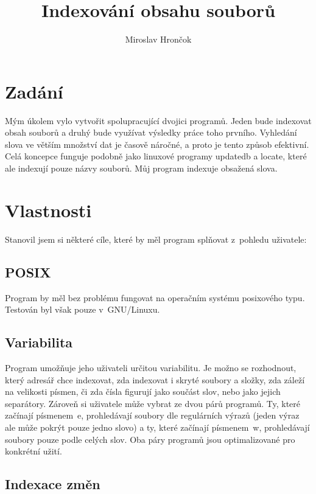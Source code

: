\documentclass[a4paper]{article}
\title{Indexování obsahu souborů}
\author{Miroslav Hrončok}
\begin{document}
\maketitle

\section{Zadání}

Mým úkolem vylo vytvořit spolupracující dvojici programů. Jeden bude indexovat obsah souborů a druhý bude využívat výsledky práce toho prvního. Vyhledání slova ve větším množství dat je časově náročné, a proto je tento způsob efektivní. Celá koncepce funguje podobně jako linuxové programy updatedb a locate, které ale indexují pouze názvy souborů. Můj program indexuje obsažená slova.

\section{Vlastnosti}

Stanovil jsem si některé cíle, které by měl program splňovat z~pohledu uživatele:

\subsection{POSIX}

Program by měl bez problému fungovat na operačním systému posixového typu. Testován byl však pouze v~GNU/Linuxu.

\subsection{Variabilita}

Program umožňuje jeho uživateli určitou variabilitu. Je možno se rozhodnout, který adresář chce indexovat, zda indexovat i skryté soubory a složky, zda záleží na velikosti písmen, či zda čísla figurují jako součást slov, nebo jako jejich separátory. Zároveň si uživatele může vybrat ze dvou párů programů. Ty, které začínají písmenem~e, prohledávají soubory dle regulárních výrazů (jeden výraz ale může pokrýt pouze jedno slovo) a ty, které začínají písmenem~w, prohledávají soubory pouze podle celých slov. Oba páry programů jsou optimalizované pro konkrétní užití.

\subsection{Indexace změn}
\end{document}
